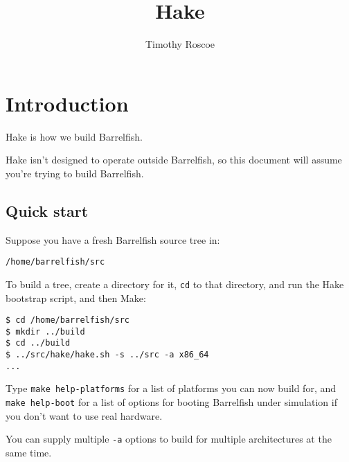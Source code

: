 \documentclass[a4paper,twoside]{report} %
\title{Hake}   %
\author{Timothy Roscoe}	%
\begin{document}
\maketitle

%
%
\begin{versionhistory}
\end{versionhistory}

\tableofcontents		%

\chapter{Introduction}

Hake is how we build Barrelfish.

Hake isn't designed to operate outside Barrelfish, so this document
will assume you're trying to build Barrelfish.

\section{Quick start}

Suppose you have a fresh Barrelfish source tree in:

\texttt{/home/barrelfish/src}

To build a tree, create a directory for it, \texttt{cd} to that
directory, and run the Hake bootstrap script, and then Make:

\begin{verbatim}
$ cd /home/barrelfish/src
$ mkdir ../build
$ cd ../build
$ ../src/hake/hake.sh -s ../src -a x86_64
...
\end{verbatim}

Type \texttt{make help-platforms} for a list of platforms you can now
build for, and \texttt{make help-boot} for a list of options for
booting Barrelfish under simulation if you don't want to use real
hardware.

You can supply multiple \texttt{-a} options to build for multiple
architectures at the same time.
\end{document}
